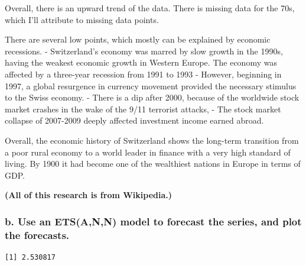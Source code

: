 \documentclass[
]{article}
\newenvironment{Shaded}{\begin{snugshade}}{\end{snugshade}}
\newcommand{\AttributeTok}[1]{\textcolor[rgb]{0.13,0.29,0.53}{#1}}
\newcommand{\CommentTok}[1]{\textcolor[rgb]{0.56,0.35,0.01}{\textit{#1}}}
\newcommand{\DecValTok}[1]{\textcolor[rgb]{0.00,0.00,0.81}{#1}}
\newcommand{\FunctionTok}[1]{\textcolor[rgb]{0.13,0.29,0.53}{\textbf{#1}}}
\newcommand{\NormalTok}[1]{#1}
\newcommand{\OtherTok}[1]{\textcolor[rgb]{0.56,0.35,0.01}{#1}}
\newcommand{\SpecialCharTok}[1]{\textcolor[rgb]{0.81,0.36,0.00}{\textbf{#1}}}
\newcommand{\StringTok}[1]{\textcolor[rgb]{0.31,0.60,0.02}{#1}}
\begin{document}
Overall, there is an upward trend of the data. There is missing data for
the 70s, which I'll attribute to missing data points.

There are several low points, which mostly can be explained by economic
recessions. - Switzerland's economy was marred by slow growth in the
1990s, having the weakest economic growth in Western Europe. The economy
was affected by a three-year recession from 1991 to 1993 - However,
beginning in 1997, a global resurgence in currency movement provided the
necessary stimulus to the Swiss economy. - There is a dip after 2000,
because of the worldwide stock market crashes in the wake of the 9/11
terrorist attacks, - The stock market collapse of 2007-2009 deeply
affected investment income earned abroad.

Overall, the economic history of Switzerland shows the long-term
transition from a poor rural economy to a world leader in finance with a
very high standard of living. By 1900 it had become one of the
wealthiest nations in Europe in terms of GDP.

\textbf{(All of this research is from Wikipedia.)}

\hypertarget{b.-use-an-etsann-model-to-forecast-the-series-and-plot-the-forecasts.}{%
\subsubsection{b. Use an ETS(A,N,N) model to forecast the series, and
plot the
forecasts.}\label{b.-use-an-etsann-model-to-forecast-the-series-and-plot-the-forecasts.}}

\begin{Shaded}
\end{Shaded}

\begin{verbatim}
[1] 2.530817
\end{verbatim}
\end{document}
